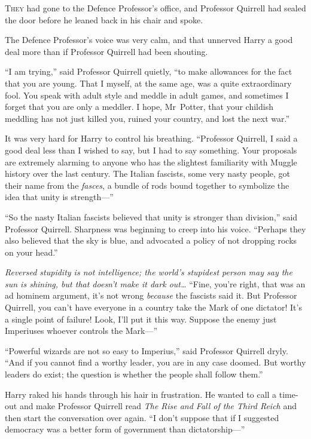 
\lettrine{T}{hey} had gone to the Defence Professor’s office, and Professor Quirrell had sealed the door before he leaned back in his chair and spoke.

The Defence Professor’s voice was very calm, and that unnerved Harry a good deal more than if Professor Quirrell had been shouting.

“I am trying,” said Professor Quirrell quietly, “to make allowances for the fact that you are young. That I myself, at the same age, was a quite extraordinary fool. You speak with adult style and meddle in adult games, and sometimes I forget that you are only a meddler. I hope, Mr~Potter, that your childish meddling has not just killed you, ruined your country, and lost the next war.”

It was very hard for Harry to control his breathing. “Professor Quirrell, I said a good deal less than I wished to say, but I had to say something. Your proposals are extremely alarming to anyone who has the slightest familiarity with Muggle history over the last century. The Italian fascists, some very nasty people, got their name from the \emph{fasces}, a bundle of rods bound together to symbolize the idea that unity is strength—”

“So the nasty Italian fascists believed that unity is stronger than division,” said Professor Quirrell. Sharpness was beginning to creep into his voice. “Perhaps they also believed that the sky is blue, and advocated a policy of not dropping rocks on your head.”

\emph{Reversed stupidity is not intelligence; the world’s stupidest person may say the sun is shining, but that doesn’t make it dark out…} “Fine, you’re right, that was an ad hominem argument, it’s not wrong \emph{because} the fascists said it. But Professor Quirrell, you can’t have everyone in a country take the Mark of one dictator! It’s a single point of failure! Look, I’ll put it this way. Suppose the enemy just Imperiuses whoever controls the Mark—”

“Powerful wizards are not so easy to Imperius,” said Professor Quirrell dryly. “And if you cannot find a worthy leader, you are in any case doomed. But worthy leaders do exist; the question is whether the people shall follow them.”

Harry raked his hands through his hair in frustration. He wanted to call a time-out and make Professor Quirrell read \emph{The Rise and Fall of the Third Reich} and then start the conversation over again. “I don’t suppose that if I suggested democracy was a better form of government than dictatorship—”

